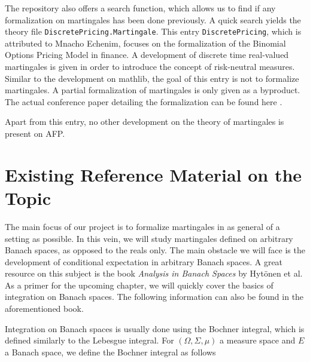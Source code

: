 The repository also offers a search function, which allows us to find if any formalization on martingales has been done previously. A quick search yields the theory file \texttt{DiscretePricing.Martingale}. This entry \texttt{DiscretePricing}, which is attributed to Mnacho Echenim, focuses on the formalization of the Binomial Options Pricing Model in finance. A development of discrete time real-valued martingales is given in order to introduce the concept of risk-neutral measures. Similar to the development on \textsf{mathlib}, the goal of this entry is not to formalize martingales. A partial formalization of martingales is only given as a byproduct. The actual conference paper detailing the formalization can be found here \cite{EchenimPeltier}.

Apart from this entry, no other development on the theory of martingales is present on \textsf{\ac{AFP}}.
\pagebreak

\section{Existing Reference Material on the Topic}

The main focus of our project is to formalize martingales in as general of a setting as possible. In this vein, we will study martingales defined on arbitrary Banach spaces, as opposed to the reals only. The main obstacle we will face is the development of conditional expectation in arbitrary Banach spaces. A great resource on this subject is the book \textit{Analysis in Banach Spaces} \cite{Hytoenen_2016} by Hytönen et al. As a primer for the upcoming chapter, we will quickly cover the basics of integration on Banach spaces. The following information can also be found in the aforementioned book.

Integration on Banach spaces is usually done using the Bochner integral, which is defined similarly to the Lebesgue integral. For $(\Omega, \Sigma, \mu)$ a measure space and $E$ a Banach space, we define the Bochner integral as follows

